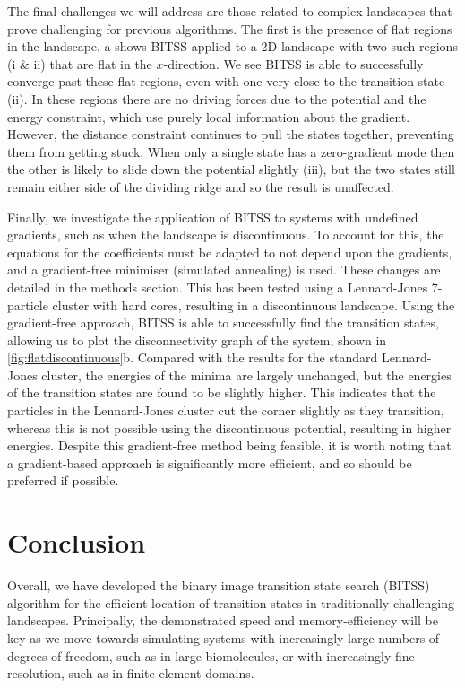 \documentclass[twocolumn,10pt]{revtex4}
\begin{document}
The final challenges we will address are those related to complex landscapes that prove challenging for previous algorithms.
The first is the presence of flat regions in the landscape.
a shows BITSS applied to a 2D landscape with two such regions (i \& ii) that are flat in the $x$-direction.
We see BITSS is able to successfully converge past these flat regions, even with one very close to the transition state (ii).
In these regions there are no driving forces due to the potential and the energy constraint, which use purely local information about the gradient.
However, the distance constraint continues to pull the states together, preventing them from getting stuck.
When only a single state has a zero-gradient mode then the other is likely to slide down the potential slightly (iii), but the two states still remain either side of the dividing ridge and so the result is unaffected.


Finally, we investigate the application of BITSS to systems with undefined gradients, such as when the landscape is discontinuous.
To account for this, the equations for the coefficients must be adapted to not depend upon the gradients, and a gradient-free minimiser (simulated annealing) is used.
These changes are detailed in the methods section.
This has been tested using a Lennard-Jones 7-particle cluster with hard cores, resulting in a discontinuous landscape.
Using the gradient-free approach, BITSS is able to successfully find the transition states, allowing us to plot the disconnectivity graph of the system, shown in \cref{fig:flatdiscontinuous}b.
Compared with the results for the standard Lennard-Jones cluster, the energies of the minima are largely unchanged, but the energies of the transition states are found to be slightly higher.
This indicates that the particles in the Lennard-Jones cluster cut the corner slightly as they transition, whereas this is not possible using the discontinuous potential, resulting in higher energies.
Despite this gradient-free method being feasible, it is worth noting that a gradient-based approach is significantly more efficient, and so should be preferred if possible.


\section{Conclusion}
Overall, we have developed the binary image transition state search (BITSS) algorithm for the efficient location of transition states in traditionally challenging landscapes.
Principally, the demonstrated speed and memory-efficiency will be key as we move towards simulating systems with increasingly large numbers of degrees of freedom, such as in large biomolecules, or with increasingly fine resolution, such as in finite element domains.
\end{document}
